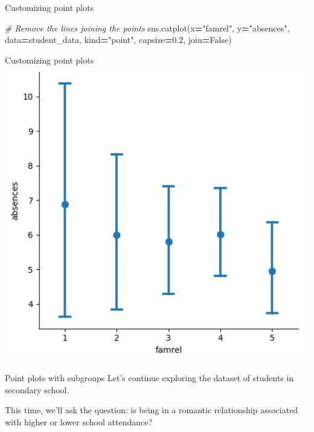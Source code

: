 \documentclass[
  ignorenonframetext,
]{beamer}
\newenvironment{Shaded}{\begin{snugshade}}{\end{snugshade}}
\newcommand{\CommentTok}[1]{\textcolor[rgb]{0.56,0.35,0.01}{\textit{#1}}}
\newcommand{\FloatTok}[1]{\textcolor[rgb]{0.00,0.00,0.81}{#1}}
\newcommand{\NormalTok}[1]{#1}
\newcommand{\OperatorTok}[1]{\textcolor[rgb]{0.81,0.36,0.00}{\textbf{#1}}}
\newcommand{\StringTok}[1]{\textcolor[rgb]{0.31,0.60,0.02}{#1}}
\newcommand{\VariableTok}[1]{\textcolor[rgb]{0.00,0.00,0.00}{#1}}
\begin{document}
\begin{frame}[fragile]{Customizing point plots}
\label{customizing-point-plots-8}

\begin{Shaded}
\begin{Highlighting}[]
\CommentTok{\# Remove the lines joining the points}
\NormalTok{sns.catplot(x}\OperatorTok{=}\StringTok{"famrel"}\NormalTok{, y}\OperatorTok{=}\StringTok{"absences"}\NormalTok{,}
\NormalTok{            data}\OperatorTok{=}\NormalTok{student\_data,}
\NormalTok{            kind}\OperatorTok{=}\StringTok{"point"}\NormalTok{,}
\NormalTok{            capsize}\OperatorTok{=}\FloatTok{0.2}\NormalTok{,}
\NormalTok{            join}\OperatorTok{=}\VariableTok{False}\NormalTok{)}
\end{Highlighting}
\end{Shaded}
\end{frame}

\begin{frame}{Customizing point plots}
\label{customizing-point-plots-9}
\includegraphics{../images/im292.png}
\end{frame}

\begin{frame}{Point plots with subgroups}
\label{point-plots-with-subgroups}
Let's continue exploring the dataset of students in secondary school.

This time, we'll ask the question: is being in a romantic relationship
associated with higher or lower school attendance?
\end{frame}
\end{document}
